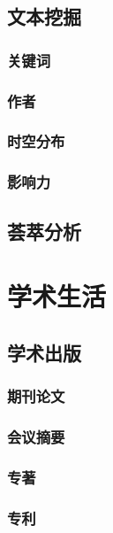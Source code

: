 \documentclass[]{book}
\begin{document}
\section{文本挖掘}

\subsection{关键词}

\subsection{作者}

\subsection{时空分布}

\subsection{影响力}

\section{荟萃分析}

\chapter{学术生活}

\section{学术出版}

\subsection{期刊论文}

\subsection{会议摘要}

\subsection{专著}

\subsection{专利}
\end{document}
